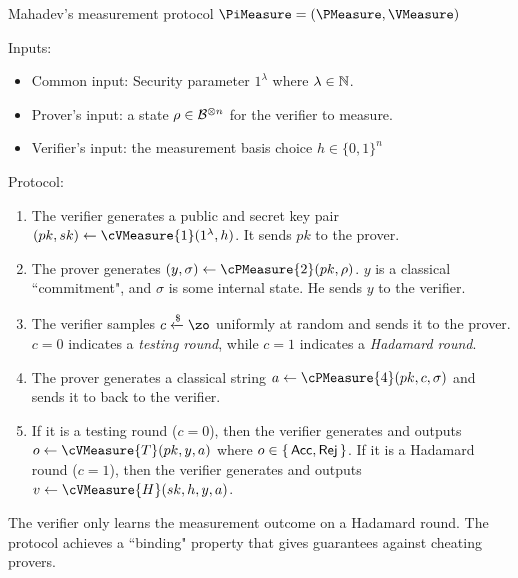 
\begin{protocol}{Mahadev's measurement protocol $\PiMeasure=(\PMeasure, \VMeasure)$}
\label{proto:urmila4}

Inputs:
\begin{itemize}
	\item Common input: Security parameter $1^\lambda$ where $\lambda\in\mathbb{N}$.
	\item Prover's input: a state $\rho\in\mathcal{B}^{\otimes n}$ for the verifier to measure.
	\item Verifier's input:
	    the measurement basis choice $h \in \{0,1\}^n$ 
\end{itemize}

Protocol:
\begin{enumerate}
	\item \label{step:measure1} The verifier generates a public and secret key pair $(pk, sk)\leftarrow\cVMeasure{1}(1^\lambda, h)$. It sends $pk$ to the prover.
	\item \label{step:measure2} The prover generates $(y, \sigma)\leftarrow\cPMeasure{2}(pk, \rho)$.
		$y$ is a classical ``commitment", and $\sigma$ is some internal state.
		He sends $y$ to the verifier.
	\item \label{step:measure3} The verifier samples $c\xleftarrow{\$}\zo$ uniformly at random and sends it to the prover. $c=0$ indicates a \emph{testing round}, while $c=1$ indicates a \emph{Hadamard round}.
	\item \label{step:measure4} The prover generates a classical string $a\leftarrow\cPMeasure{4}(pk, c, \sigma)$ and sends it to back to the verifier.
	\item \label{step:output} If it is a testing round ($c=0$), then the verifier generates and outputs $o\leftarrow\cVMeasure{T}(pk, y, a)$ where $o\in\set{\mathsf{Acc}, \mathsf{Rej}}$.
		If it is a Hadamard round ($c=1$), then the verifier generates and outputs $v\leftarrow\cVMeasure{H}(sk, h, y, a)$.
\end{enumerate}
\end{protocol}

The verifier only learns the measurement outcome on a Hadamard round.
The protocol achieves a ``binding" property that gives guarantees against cheating provers.



